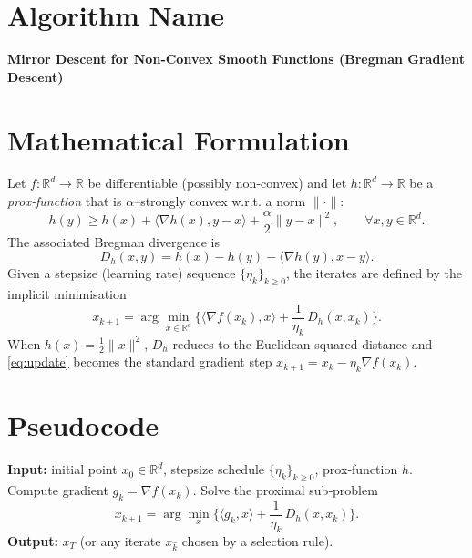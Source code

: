 \documentclass{article}
\newcommand{\ip}[2]{\langle #1,#2\rangle}
\newcommand{\grad}{\nabla}
\newcommand{\D}{D_{h}}
\newcommand{\R}{\mathbb{R}}
\begin{document}
\section*{Algorithm Name}
\textbf{Mirror Descent for Non‑Convex Smooth Functions (Bregman Gradient Descent)}

\section*{Mathematical Formulation}
Let $f:\R^{d}\rightarrow\R$ be differentiable (possibly non‑convex) and let $h:\R^{d}\rightarrow\R$ be a \emph{prox‑function} that is $\alpha$–strongly convex w.r.t. a norm $\|\cdot\|$:
\[
h(y)\ge h(x)+\ip{\grad h(x)}{y-x}+\frac{\alpha}{2}\|y-x\|^{2},
\qquad\forall x,y\in\R^{d}.
\]
The associated Bregman divergence is
\[
\D(x,y)=h(x)-h(y)-\ip{\grad h(y)}{x-y}.
\]
Given a stepsize (learning rate) sequence $\{\eta_k\}_{k\ge0}$, the iterates are defined by the implicit minimisation
\begin{equation}
\label{eq:update}
x_{k+1}= \arg\min_{x\in\R^{d}}\Big\{ \ip{\grad f(x_k)}{x}+ \frac{1}{\eta_k}\,\D(x,x_k)\Big\}.
\end{equation}
When $h(x)=\frac12\|x\|^{2}$, $\D$ reduces to the Euclidean squared distance and \eqref{eq:update} becomes the standard gradient step
$x_{k+1}=x_k-\eta_k\grad f(x_k)$.

\section*{Pseudocode}
\begin{algorithm}[H]
\caption{Bregman Gradient Descent (Mirror Descent) }
\begin{algorithmic}[1]
\STATE \textbf{Input:} initial point $x_0\in\R^{d}$, stepsize schedule $\{\eta_k\}_{k\ge0}$, prox‑function $h$.
    \STATE Compute gradient $g_k=\grad f(x_k)$.
    \STATE Solve the proximal sub‑problem
    \[
    x_{k+1}= \arg\min_{x}\Big\{ \ip{g_k}{x}+ \frac{1}{\eta_k}\,\D(x,x_k)\Big\}.
    \]
\ENDFOR
\STATE \textbf{Output:} $x_T$ (or any iterate $x_{\hat k}$ chosen by a selection rule).
\end{algorithmic}
\end{algorithm}
\end{document}

